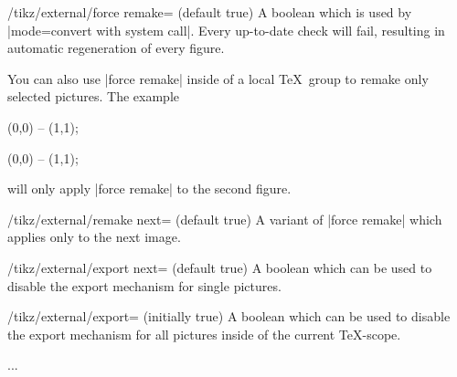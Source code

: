 {\begin{key}{/tikz/external/force remake= (default true)}
	A boolean which is used by |mode=convert with system call|. Every up-to-date check will fail, resulting in automatic regeneration of every figure.

\begin{codeexample}
\tikzset{external/force remake}
\end{codeexample}
	You can also use |force remake| inside of a local \TeX\ group to remake only selected pictures. The example
\begin{codeexample}
\tikz \draw (0,0) -- (1,1);

{
\tikzset{external/force remake}
}

\tikz \draw (0,0) -- (1,1);
\end{codeexample}
	will only apply |force remake| to the second figure.
\end{key}

\begin{key}{/tikz/external/remake next= (default true)}
	A variant of |force remake| which applies only to the next image.
\end{key}

\begin{key}{/tikz/external/export next= (default true)}
	A boolean which can be used to disable the export mechanism for single pictures.
\end{key}

\begin{key}{/tikz/external/export= (initially true)}
	A boolean which can be used to disable the export mechanism for all pictures inside of the current \TeX-scope. 

\begin{codeexample}


{
\tikzset{external/export=false}
...
} 


\end{codeexample}
\end{key}}
